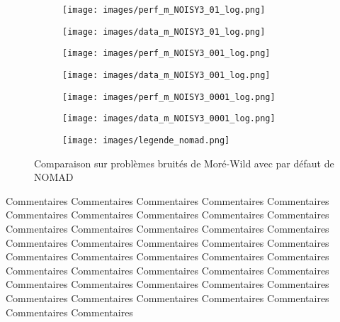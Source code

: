		\begin{figure}[!htb] %
			\centering
			\begin{subfigure}{0.43\textwidth}
				\texttt{[image: images/perf\_m\_NOISY3\_01\_log.png]}
			\end{subfigure}%
			\begin{subfigure}{0.43\textwidth}
				\texttt{[image: images/data\_m\_NOISY3\_01\_log.png]}
			\end{subfigure}
			\smallskip
			\begin{subfigure}{0.43\textwidth}
				\texttt{[image: images/perf\_m\_NOISY3\_001\_log.png]}
			\end{subfigure}%
			\begin{subfigure}{0.43\textwidth}
				\texttt{[image: images/data\_m\_NOISY3\_001\_log.png]}
			\end{subfigure}
			\smallskip
			\begin{subfigure}{0.43\textwidth}
				\texttt{[image: images/perf\_m\_NOISY3\_0001\_log.png]}
			\end{subfigure}%
			\begin{subfigure}{0.43\textwidth}
				\texttt{[image: images/data\_m\_NOISY3\_0001\_log.png]}
			\end{subfigure}
			\smallskip
			\begin{subfigure}{0.95\textwidth}
				\texttt{[image: images/legende\_nomad.png]}
			\end{subfigure}
			\caption{Comparaison sur problèmes bruités de Moré-Wild avec \MADS par défaut de NOMAD} \label{fig:3}
		\end{figure}
		\clearpage
		Commentaires Commentaires Commentaires Commentaires Commentaires Commentaires Commentaires Commentaires Commentaires Commentaires Commentaires Commentaires Commentaires Commentaires Commentaires Commentaires Commentaires Commentaires Commentaires Commentaires Commentaires Commentaires Commentaires Commentaires Commentaires Commentaires Commentaires Commentaires Commentaires Commentaires Commentaires Commentaires Commentaires Commentaires Commentaires Commentaires Commentaires Commentaires Commentaires Commentaires Commentaires Commentaires 
		\clearpage
